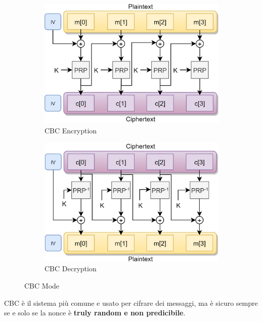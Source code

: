 \begin{figure}[h]
    \centering
    \begin{subfigure}[b]{0.48\textwidth}
    \includegraphics[width=\textwidth]{image/cbcenc.png}
    \caption{CBC Encryption}
    \label{fig:cbcenc}
    \end{subfigure}\quad
    \begin{subfigure}[b]{0.48\textwidth}
    \includegraphics[width=\textwidth]{image/cbcdec.png}
    \caption{CBC Decryption}
    \label{fig:cbcdec}
    \end{subfigure}
    \caption{CBC Mode}
\end{figure}
\begin{note}
CBC è il sistema più comune e usato per cifrare dei messaggi, ma è sicuro sempre se e solo se la nonce è \textbf{truly random e non predicibile}.
\end{note}

